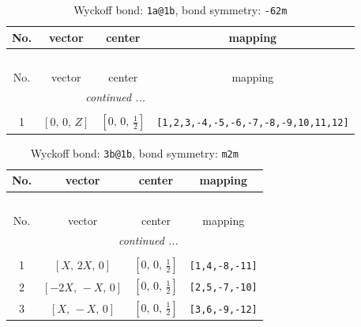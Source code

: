 \documentclass[fleqn,8pt]{jsarticle}
\begin{document}
\begin{longtable}{cccc}
\caption{Wyckoff bond: {\tt 1a@1b}, bond symmetry: {\tt -62m}}
 \\
 \hline \hline
No. & vector & center & mapping \\ \hline \endfirsthead

\multicolumn{3}{l}{\tablename\ \thetable{}} \\
 \hline \hline
No. & vector & center & mapping \\ \hline \endhead

 \hline \hline
\multicolumn{3}{r}{\footnotesize\it continued ...} \\ \endfoot

 \hline \hline
\multicolumn{3}{r}{} \\ \endlastfoot

1 & $\left[ 0,\, 0,\, Z \right]$ & $\left[ 0,\, 0,\, \frac{1}{2} \right]$ & {\tt [1,2,3,-4,-5,-6,-7,-8,-9,10,11,12]} \\
\end{longtable}
\renewcommand{\arraystretch}{1.2}
\begin{longtable}{cccc}
\caption{Wyckoff bond: {\tt 3b@1b}, bond symmetry: {\tt m2m}}
 \\
 \hline \hline
No. & vector & center & mapping \\ \hline \endfirsthead

\multicolumn{3}{l}{\tablename\ \thetable{}} \\
 \hline \hline
No. & vector & center & mapping \\ \hline \endhead

 \hline \hline
\multicolumn{3}{r}{\footnotesize\it continued ...} \\ \endfoot

 \hline \hline
\multicolumn{3}{r}{} \\ \endlastfoot

1 & $\left[ X,\, 2 X,\, 0 \right]$ & $\left[ 0,\, 0,\, \frac{1}{2} \right]$ & {\tt [1,4,-8,-11]} \\ \hline
2 & $\left[ - 2 X,\, - X,\, 0 \right]$ & $\left[ 0,\, 0,\, \frac{1}{2} \right]$ & {\tt [2,5,-7,-10]} \\ \hline
3 & $\left[ X,\, - X,\, 0 \right]$ & $\left[ 0,\, 0,\, \frac{1}{2} \right]$ & {\tt [3,6,-9,-12]} \\
\end{longtable}
\renewcommand{\arraystretch}{1.2}
\end{document}
